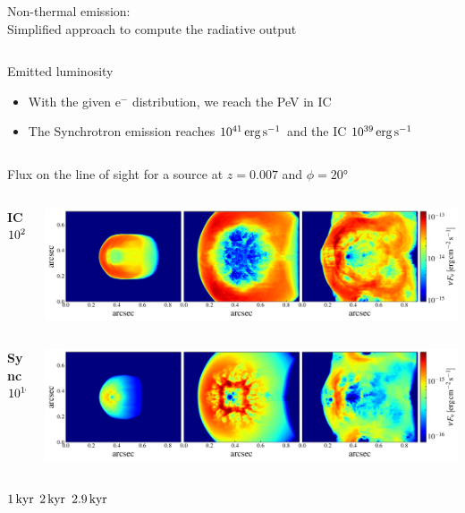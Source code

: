 \begin{frame}{Non-thermal emission:\\
	Simplified approach to compute the radiative output}
\begin{columns}
{\begin{column}{.5\textwidth}
			\begin{exampleblock}{Emitted luminosity}
				\begin{itemize}
					\item With the given e$^{-}$ distribution, we reach the PeV in IC
					\item The Synchrotron emission reaches $10^{41}\,{\rm erg}\,{\rm s}^{-1}$
							and the IC $10^{39}\,{\rm erg}\,{\rm s}^{-1}$
				\end{itemize}
			\end{exampleblock}
			\centering
		\end{column}
		}
	\end{columns}
\end{frame}
\begin{frame}{Flux on the line of sight for a source at $z=0.007$ and $\phi=20$°}
	\begin{columns}
		\begin{column}{0.1\textwidth}
				{\small {\bf IC} \\$10^{27}\,{\rm Hz}$  }
		\end{column}
		\begin{column}{\textwidth}
	\includegraphics[width=\linewidth]{images/2dmaps/2Dmap_flux_freq_27_dist_31_phi_20_ic.pdf}
		\end{column}
	\end{columns}
	\begin{columns}
		\begin{column}{0.1\textwidth}
				{\small{\bf Sync} \\ $10^{10}\,{\rm Hz}$}
		\end{column}
		\begin{column}{\textwidth}

	\includegraphics[width=\linewidth]{images/2dmaps/2Dmap_flux_freq_10_dist_31_phi_20_sync.pdf}
		\end{column}
	\end{columns}
	\vspace{8pt}
		\hspace{70pt} $1\,{\rm kyr}$ \hspace{60pt} $2\,{\rm kyr}$ \hspace{60pt} $2.9\,{\rm kyr}$
\end{frame}

